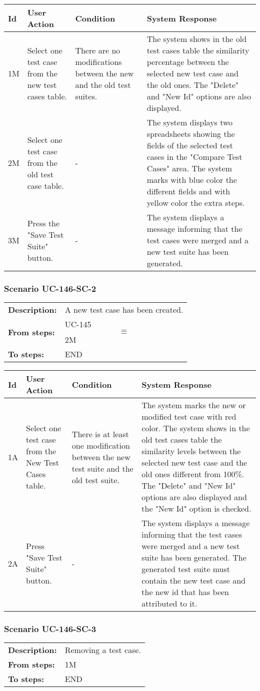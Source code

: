 \documentclass[a4paper,11pt]{article}
\newcommand{\bl}{\\ \hline}
\begin{document}
\begin{tabular}{|p{0.8in}|p{1.6in}|p{1.6in}|p{1.6in}|}
\hline
Id & User Action & Condition & System Response  \bl 
1M & Select one test case from the new test cases table. & There are no modifications between the new and the old test suites. & The system shows in the old test cases table the similarity percentage between the selected new test case and the old ones. The "Delete" and "New Id" options are also displayed. \bl 
2M & Select one test case from the old test case table. & - & The system displays two spreadsheets showing the fields of the selected test cases in the "Compare Test Cases" area. The system marks with blue color the different fields and with yellow color the extra steps. \bl 
3M & Press the "Save Test Suite" button. & - & The system displays a message informing that the test cases were merged and a new test suite has been generated. \bl 
\end{tabular}
\subsubsection*{Scenario UC-146-SC-2}
\begin{tabular}{p{1in}p{4in}}
{\bf Description:} & A new test case has been created. \\
{\bf From steps:} & UC-145$$\equiv$$2M \\
{\bf To steps:} & END \\
\end{tabular}
 
\begin{tabular}{|p{0.8in}|p{1.6in}|p{1.6in}|p{1.6in}|}
\hline
Id & User Action & Condition & System Response  \bl 
1A & Select one test case from the New Test Cases table. & There is at least one modification between the new test suite and the old test suite. & The system marks the new or modified test case with red color. The system shows in the old test cases table the similarity levels between the selected new test case and the old ones different from 100\%. The "Delete" and "New Id" options are also displayed and the "New Id" option is checked. \bl 
2A & Press "Save Test Suite" button. & - & The system displays a message informing that the test cases were merged and a new test suite has been generated. The generated test suite must contain the new test case and the new id that has been attributed to it. \bl 
\end{tabular}
\subsubsection*{Scenario UC-146-SC-3}
\begin{tabular}{p{1in}p{4in}}
{\bf Description:} & Removing a test case. \\
{\bf From steps:} & 1M \\
{\bf To steps:} & END \\
\end{tabular}
 
\end{document}
